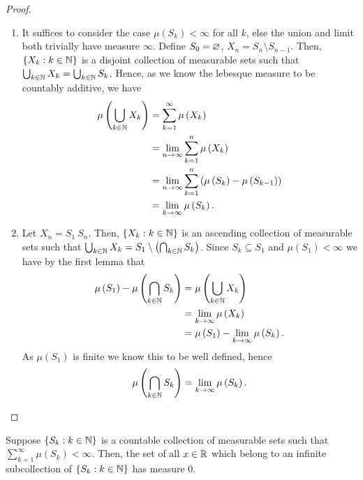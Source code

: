 \begin{proof}
\begin{enumerate}
	\item It suffices to consider the case \( \mu\left( S_{k} \right) < \infty\) for all \(k\), else the union and limit both trivially have measure \(\infty\). Define \(S_0 = \varnothing\), \(X_{n} = S_{n} \setminus S_{n - 1}\). Then, \(\{X_{k} : k \in \mathbb{N}\} \) is a disjoint collection of measurable sets such that \(\bigcup_{k \in \mathbb{N}} X_{k} = \bigcup_{k \in \mathbb{N}} S_{k} \). Hence, as we know the lebesque measure to be countably additive, we have
		\begin{align*}
			\mu\left( \bigcup_{k \in \N} X_{k} \right) &=  \sum_{k=1}^{\infty} \mu\left( X_{k} \right)  \\
								   &= \lim_{n \to \infty}\sum_{k=1}^{n} \mu\left( X_{k} \right)  \\
								   &=  \lim_{n \to \infty}\sum_{k=1}^{n} \left( \mu\left( S_{k} \right) - \mu\left( S_{ k - 1} \right)  \right)  \\
								   &=  \lim_{k \to \infty} \mu\left( S_{k} \right)
		.\end{align*}
	\item Let \(X_{n} = S_1 \ S_{n}\). Then, \(\{X_{k} : k \in \mathbb{N}\} \) is an ascending collection of measurable sets such that \(\bigcup_{k \in \mathbb{N}} X_{k}= S_1 \setminus \left( \bigcap_{k \in \mathbb{N}}S_{k}  \right)  \). Since \(S_{k} \subseteq S_1\) and \( \mu\left( S_1 \right)  < \infty\) we have by the first lemma that
		\begin{align*}
		\mu\left( S_1 \right) - \mu\left( \bigcap_{k \in \N} S_{k} \right) &=  \mu\left( \bigcup_{k \in \N} X_{k} \right)  \\
			   &= \lim_{k \to \infty} \mu\left( X_{k} \right) \\
	   &= \mu\left( S_1 \right) - \lim_{k \to \infty} \mu\left( S_{k} \right)
		.\end{align*}
		As \( \mu\left( S_1 \right) \) is finite we know this to be well defined, hence
		\[
			\mu\left( \bigcap_{k \in \N}  S_{k} \right)  = \lim_{k \to \infty} \mu\left( S_{k} \right)
		.\]
\end{enumerate}
\end{proof}
\begin{theorem}
	Suppose \(\{S_{k} : k \in \mathbb{N}\} \) is a countable collection of measurable sets such that \(\sum_{k=1}^{\infty} \mu\left( S_{k} \right)  < \infty\). Then, the set of all \(x \in \mathbb{R}\) which belong to an infinite subcollection of \(\{S_{k} : k \in \mathbb{N}\} \) has measure \(0\).
\end{theorem}
